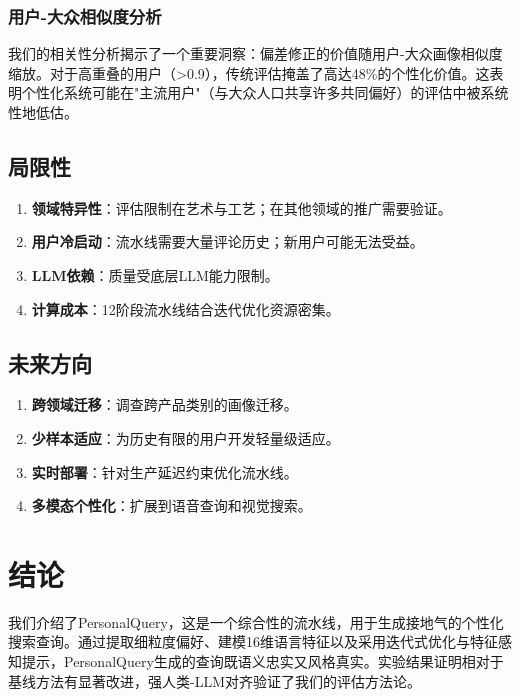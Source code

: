 \documentclass[11pt,a4paper]{article}
\begin{document}
\subsubsection{用户-大众相似度分析}

我们的相关性分析揭示了一个重要洞察：偏差修正的价值随用户-大众画像相似度缩放。对于高重叠的用户（>0.9），传统评估掩盖了高达48\%的个性化价值。这表明个性化系统可能在"主流用户"（与大众人口共享许多共同偏好）的评估中被系统性地低估。

\subsection{局限性}

\begin{enumerate}
    \item \textbf{领域特异性}：评估限制在艺术与工艺；在其他领域的推广需要验证。
    \item \textbf{用户冷启动}：流水线需要大量评论历史；新用户可能无法受益。
    \item \textbf{LLM依赖}：质量受底层LLM能力限制。
    \item \textbf{计算成本}：12阶段流水线结合迭代优化资源密集。
\end{enumerate}

\subsection{未来方向}

\begin{enumerate}
    \item \textbf{跨领域迁移}：调查跨产品类别的画像迁移。
    \item \textbf{少样本适应}：为历史有限的用户开发轻量级适应。
    \item \textbf{实时部署}：针对生产延迟约束优化流水线。
    \item \textbf{多模态个性化}：扩展到语音查询和视觉搜索。
\end{enumerate}

\section{结论}

我们介绍了PersonalQuery，这是一个综合性的流水线，用于生成接地气的个性化搜索查询。通过提取细粒度偏好、建模16维语言特征以及采用迭代式优化与特征感知提示，PersonalQuery生成的查询既语义忠实又风格真实。实验结果证明相对于基线方法有显著改进，强人类-LLM对齐验证了我们的评估方法论。
\end{document}
